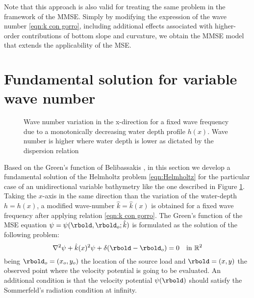 Note that this approach is also valid for treating the same problem in the framework of the MMSE. Simply by modifying the expression of the wave number \eqref{eqn:k con gorro}, including additional effects associated with higher-order contributions of bottom slope and curvature, we obtain the MMSE model that extends the applicability of the MSE.

\section{Fundamental solution for variable wave number}
\label{sec-FS}

\begin{figure}
\centering
\def\svgwidth{0.8\columnwidth}

\caption{Wave number variation in the x-direction for a fixed wave frequency due to a monotonically decreasing water depth profile $h(x)$. Wave number is higher where water depth is lower as dictated by the dispersion relation}
\label{fig:Wavenumber-variation}
\end{figure}

Based on the Green's function of Belibassakis \cite{Belibassakis2000}, in this section we develop a fundamental solution of the Helmholtz problem \eqref{eqn:Helmholtz} for the particular case of an unidirectional variable bathymetry like the one described in Figure \ref{fig:Wavenumber-variation}. Taking the $x$-axis in the same direction than the variation of the water-depth $h=h(x)$, a modified wave-number $\hat{k}=\hat{k}(x)$ is obtained for a fixed wave frequency after applying relation \eqref{eqn:k con gorro}. The Green's function of the MSE equation $\psi=\psi(\rbold,\rbold_{o};\hat{k})$ is formulated as the solution of the following problem: 
\begin{equation}
\label{eqn:Green}
\nabla^{2}\psi+\hat{k}(x)^{2}\psi + \delta(\rbold-\rbold_o) = 0 \quad \text{in } \mathbb{R}^2
\end{equation}
being $\rbold_{o}=(x_{o},y_{o})$ the location of the source load and $\rbold=(x,y)$ the observed point where the velocity potential is going to be evaluated. An additional condition is that the velocity potential $\psi(\rbold)$ should satisfy the Sommerfeld's radiation condition at infinity.

